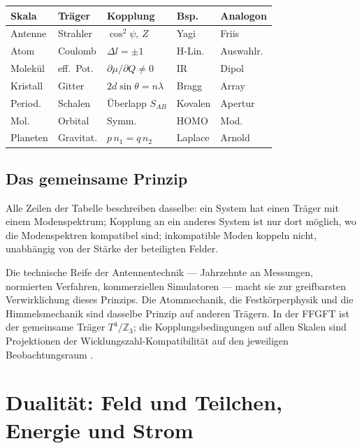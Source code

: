 \begin{center}
\begin{tabular}{@{}lp{1.5cm}p{1.9cm}p{1.3cm}p{1.5cm}@{}}
\toprule
\textbf{Skala} & \textbf{Träger} & \textbf{Kopplung}
  & \textbf{Bsp.} & \textbf{Analogon} \\
\midrule
Antenne & Strahler & $\cos^2\psi$, $Z$ & Yagi & Friis \\
Atom & Coulomb & $\Delta l=\pm1$ & H-Lin. & Auswahlr. \\
Molekül & eff.~Pot. & $\partial\mu/\partial Q\neq0$ & IR & Dipol \\
Kristall & Gitter & $2d\sin\theta=n\lambda$ & Bragg & Array \\
Period. & Schalen & Überlapp $S_{AB}$ & Kovalen & Apertur \\
Mol. & Orbital & Symm. & HOMO & Mod. \\
Planeten & Gravitat. & $p\,n_1=q\,n_2$ & Laplace & Arnold \\
\bottomrule
\end{tabular}
\end{center}

\subsection*{Das gemeinsame Prinzip}

Alle Zeilen der Tabelle beschreiben dasselbe: ein System hat einen
Träger mit einem Modenspektrum; Kopplung an ein anderes System ist
nur dort möglich, wo die Modenspektren kompatibel sind; inkompatible
Moden koppeln nicht, unabhängig von der Stärke der beteiligten Felder.

Die technische Reife der Antennentechnik --- Jahrzehnte an Messungen,
normierten Verfahren, kommerziellen Simulatoren --- macht sie zur
greifbarsten Verwirklichung dieses Prinzips. Die Atommechanik,
die Festkörperphysik und die Himmelsmechanik sind dasselbe Prinzip
auf anderen Trägern. In der FFGFT ist der gemeinsame Träger
$T^4/\mathbb{Z}_3$; die Kopplungsbedingungen auf allen Skalen sind
Projektionen der Wicklungszahl-Kompatibilität auf den jeweiligen
Beobachtungsraum \SM.

\section{Dualität: Feld und Teilchen, Energie und Strom}


